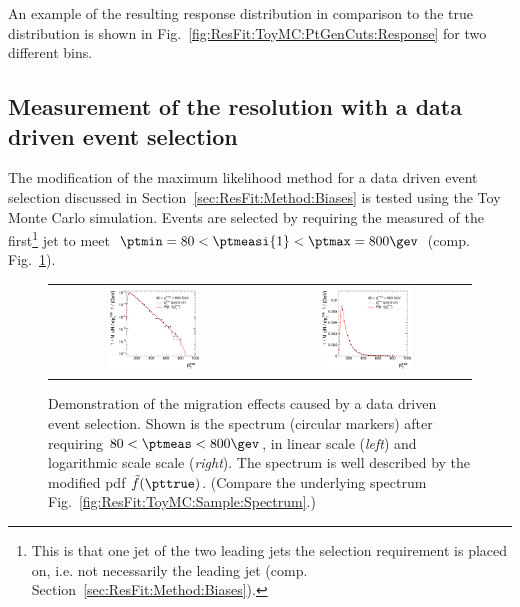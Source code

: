 An example of the resulting response distribution in comparison to the true
distribution is shown in Fig.~\ref{fig:ResFit:ToyMC:PtGenCuts:Response} for
two different \pttrue bins.


\subsection{Measurement of the resolution with a data driven event
  selection}\label{sec:ResFit:ToyMC:PtCaloCuts}

The modification of the maximum likelihood method for a data driven
event selection discussed in Section~\ref{sec:ResFit:Method:Biases} is
tested using the Toy Monte Carlo simulation.
Events are selected by requiring the measured \pt of the
first\footnote{This is that one jet of the two leading jets the
  selection requirement is placed on, i.e. not necessarily the leading
  jet (comp. Section~\ref{sec:ResFit:Method:Biases}).} jet to
meet \mbox{$\ptmin = 80 < \ptmeasi{1} < \ptmax = 800\gev$} (comp. Fig.~\ref{fig:ResFit:ToyMC:PtCuts:Spectrum}).

\begin{figure}[ht]
  \centering
  \begin{tabular}{cc}
    \includegraphics[width=0.45\textwidth]{figures/resFit_ToyMC_PtCuts_SpectrumLog} &
    \includegraphics[width=0.45\textwidth]{figures/resFit_ToyMC_PtCuts_SpectrumLinear} \\
  \end{tabular}
  \caption{Demonstration of the migration effects caused by a data
    driven event selection.
    Shown is the \pttrue spectrum (circular markers) after
    requiring \mbox{$80 < \ptmeas < 800\gev$}, in linear scale
    (\textit{left}) and logarithmic scale scale (\textit{right}).
    The spectrum is well described by the modified pdf
    $\tilde{f}(\pttrue)$.
    (Compare the underlying spectrum Fig.~\ref{fig:ResFit:ToyMC:Sample:Spectrum}.)
  }
  \label{fig:ResFit:ToyMC:PtCuts:Spectrum}
\end{figure}



